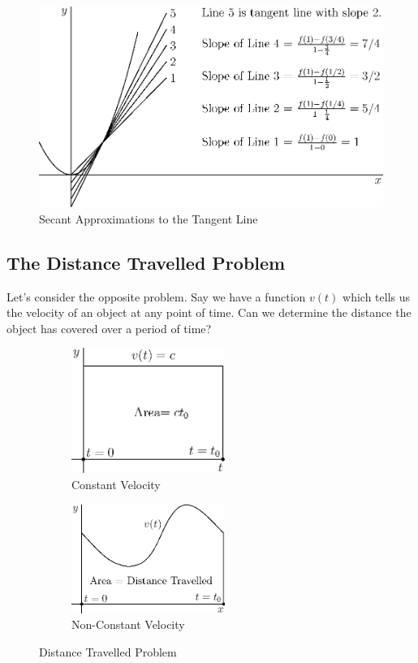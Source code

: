 \documentclass[fleqn]{report}
\begin{document}
\begin{figure}[ht]
\centering
\includegraphics[width=12cm]{figure13.eps}
\caption{Secant Approximations to the Tangent Line}
\label{figure-secant-approximations1}
\end{figure}

\subsection{The Distance Travelled Problem}
\label{distance-problem}

Let's consider the opposite problem. Say we have a function
$v(t)$ which tells us the velocity of an object at any point
of time. Can we determine the distance the object has covered
over a period of time? 

\begin{figure}[ht]
\centering
\begin{subfigure}{.5\textwidth}
 \centering
 \includegraphics[width=5cm]{figure14.eps}
 \caption{Constant Velocity}
\end{subfigure}%
\begin{subfigure}{.5\textwidth}
 \centering
 \includegraphics[width=5cm]{figure15.eps}
 \caption{Non-Constant Velocity}
\end{subfigure}
\caption{Distance Travelled Problem}
\label{figure-distance-travelled1}
\end{figure}
\end{document}

